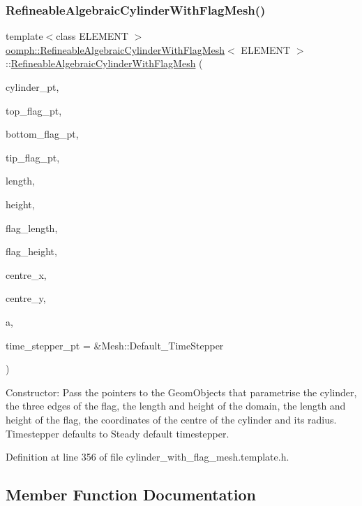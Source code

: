 \subsubsection{\texorpdfstring{Refineable\+Algebraic\+Cylinder\+With\+Flag\+Mesh()}{RefineableAlgebraicCylinderWithFlagMesh()}}
{\footnotesize\ttfamily template$<$class E\+L\+E\+M\+E\+NT $>$ \\
\hyperlink{classoomph_1_1RefineableAlgebraicCylinderWithFlagMesh}{oomph\+::\+Refineable\+Algebraic\+Cylinder\+With\+Flag\+Mesh}$<$ E\+L\+E\+M\+E\+NT $>$\+::\hyperlink{classoomph_1_1RefineableAlgebraicCylinderWithFlagMesh}{Refineable\+Algebraic\+Cylinder\+With\+Flag\+Mesh} (\begin{DoxyParamCaption}\item[{Circle $\ast$}]{cylinder\+\_\+pt,  }\item[{Geom\+Object $\ast$}]{top\+\_\+flag\+\_\+pt,  }\item[{Geom\+Object $\ast$}]{bottom\+\_\+flag\+\_\+pt,  }\item[{Geom\+Object $\ast$}]{tip\+\_\+flag\+\_\+pt,  }\item[{const double \&}]{length,  }\item[{const double \&}]{height,  }\item[{const double \&}]{flag\+\_\+length,  }\item[{const double \&}]{flag\+\_\+height,  }\item[{const double \&}]{centre\+\_\+x,  }\item[{const double \&}]{centre\+\_\+y,  }\item[{const double \&}]{a,  }\item[{Time\+Stepper $\ast$}]{time\+\_\+stepper\+\_\+pt = {\ttfamily \&Mesh\+:\+:Default\+\_\+TimeStepper} }\end{DoxyParamCaption})\hspace{0.3cm}{\ttfamily [inline]}}



Constructor\+: Pass the pointers to the Geom\+Objects that parametrise the cylinder, the three edges of the flag, the length and height of the domain, the length and height of the flag, the coordinates of the centre of the cylinder and its radius. Timestepper defaults to Steady default timestepper. 



Definition at line 356 of file cylinder\+\_\+with\+\_\+flag\+\_\+mesh.\+template.\+h.



\subsection{Member Function Documentation}
\mbox{\label{classoomph_1_1RefineableAlgebraicCylinderWithFlagMesh_a186963cf4b1fc118929e49e012eba4d2}} 
